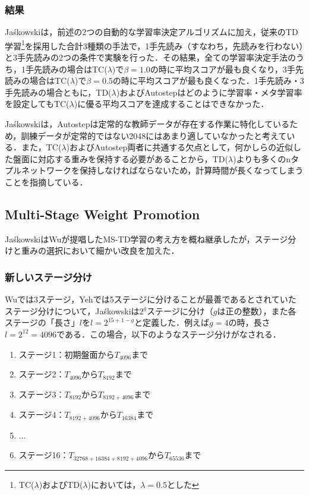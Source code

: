 \documentclass{suribt}
\begin{document}
\subsubsection{結果}
Ja\'{s}kowskiは，前述の2つの自動的な学習率決定アルゴリズムに加え，従来のTD学習\footnote{TC(${\lambda}$)およびTD(${\lambda}$)においては，${\lambda}=0.5$とした}を採用した合計3種類の手法で，1手先読み（すなわち，先読みを行わない）と3手先読みの2つの条件で実験を行った．その結果，全ての学習率決定手法のうち，1手先読みの場合はTC(${\lambda}$)で${\beta}=1.0$の時に平均スコアが最も良くなり，3手先読みの場合はTC(${\lambda}$)で${\beta}=0.5$の時に平均スコアが最も良くなった．1手先読み・3手先読みの場合ともに，TD(${\lambda}$)およびAutostepはどのように学習率・メタ学習率を設定してもTC(${\lambda}$)に優る平均スコアを達成することはできなかった．

Ja\'{s}kowskiは，Autostepは定常的な教師データが存在する作業に特化しているため，訓練データが定常的ではない2048にはあまり適していなかったと考えている．また，TC(${\lambda}$)およびAutostep両者に共通する欠点として，何かしらの近似した盤面に対応する重みを保持する必要があることから，TD(${\lambda}$)よりも多くのnタプルネットワークを保持しなければならないため，計算時間が長くなってしまうことを指摘している．

\subsection{Multi-Stage Weight Promotion}
Ja\'{s}kowskiはWuが提唱したMS-TD学習の考え方を概ね継承したが，ステージ分けと重みの選択において細かい改良を加えた．

\subsubsection{新しいステージ分け}
Wuでは3ステージ，Yehでは5ステージに分けることが最善であるとされていたステージ分けについて，Ja\'{s}kowskiは$2^g$ステージに分け（$g$は正の整数），また各ステージの「長さ」$l$を$l = 2^{15+1-g}$と定義した．例えば$g=4$の時，長さ$l=2^{12}=4096$である．この場合，以下のようなステージ分けがなされる．

\begin{enumerate}
\item ステージ1：初期盤面から$T_{4096}$まで
\item ステージ2：$T_{4096}$から$T_{8192}$まで
\item ステージ3：$T_{8192}$から$T_{8192+4096}$まで
\item ステージ4：$T_{8192+4096}$から$T_{16384}$まで
\item ...
\item ステージ16：$T_{32768+16384+8192+4096}$から$T_{65536}$まで
\end{enumerate}
\end{document}
